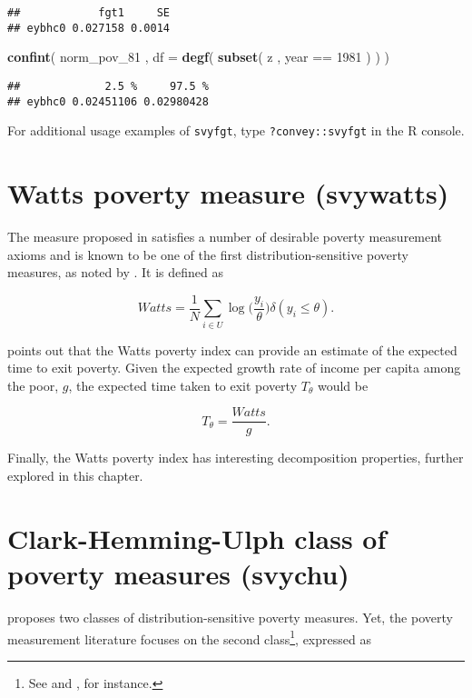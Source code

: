 \documentclass[]{book}
\newenvironment{Shaded}{\begin{snugshade}}{\end{snugshade}}
\newcommand{\KeywordTok}[1]{\textcolor[rgb]{0.13,0.29,0.53}{\textbf{{#1}}}}
\newcommand{\DataTypeTok}[1]{\textcolor[rgb]{0.13,0.29,0.53}{{#1}}}
\newcommand{\DecValTok}[1]{\textcolor[rgb]{0.00,0.00,0.81}{{#1}}}
\newcommand{\StringTok}[1]{\textcolor[rgb]{0.31,0.60,0.02}{{#1}}}
\newcommand{\NormalTok}[1]{{#1}}
\let\rmarkdownfootnote\footnote%
\def\footnote{\protect\rmarkdownfootnote}
\begin{document}
\begin{verbatim}
##            fgt1     SE
## eybhc0 0.027158 0.0014
\end{verbatim}

\begin{Shaded}
\begin{Highlighting}[]
\KeywordTok{confint}\NormalTok{( norm_pov_81 , }\DataTypeTok{df =} \KeywordTok{degf}\NormalTok{( }\KeywordTok{subset}\NormalTok{( z , year ==}\StringTok{ }\DecValTok{1981} \NormalTok{) ) )}
\end{Highlighting}
\end{Shaded}

\begin{verbatim}
##             2.5 %     97.5 %
## eybhc0 0.02451106 0.02980428
\end{verbatim}

For additional usage examples of \texttt{svyfgt}, type
\texttt{?convey::svyfgt} in the R console.

\section{Watts poverty measure
(svywatts)}\label{watts-poverty-measure-svywatts}

The measure proposed in \citet{watts1968} satisfies a number of
desirable poverty measurement axioms and is known to be one of the first
distribution-sensitive poverty measures, as noted by
\citet{haughton2009}. It is defined as

\[
Watts = \frac{1}{N} \sum_{i \in U} \log{ \bigg( \frac{y_i}{\theta} \bigg) \delta ( y_i \leqslant \theta) }.
\]

\citet{murdoch1998} points out that the Watts poverty index can provide
an estimate of the expected time to exit poverty. Given the expected
growth rate of income per capita among the poor, \(g\), the expected
time taken to exit poverty \(T_\theta\) would be

\[
T_\theta = \frac{Watts}{g}.
\]

Finally, the Watts poverty index has interesting decomposition
properties, further explored in this chapter.

\section{Clark-Hemming-Ulph class of poverty measures
(svychu)}\label{clark-hemming-ulph-class-of-poverty-measures-svychu}

\citet{clark1981} proposes two classes of distribution-sensitive poverty
measures. Yet, the poverty measurement literature focuses on the second
class\footnote{See \citet{atkinson1987} and \citet{verma2011}, for
  instance.}, expressed as
\end{document}
